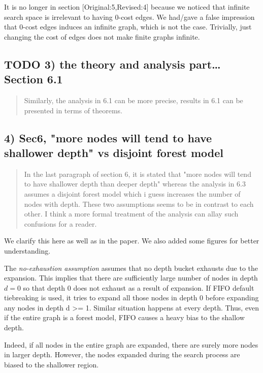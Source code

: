 \documentclass{article}
\begin{document}
It is no longer in section [Original:5,Revised:4] because we noticed that
infinite search space is irrelevant to having 0-cost edges.
We had/gave a false impression that 0-cost edges induces an infinite graph, which is not the case.
Trivially, just changing the cost of edges does not make finite graphs infinite.

\subsection{{\bfseries\sffamily TODO} 3) the theory and analysis part\ldots{} Section 6.1}
\label{sec:orgheadline17}

\begin{quote}
Similarly, the analysis in 6.1 can be more
precise, results in 6.1 can be presented in terms of theorems.
\end{quote}

\subsection{4) Sec6, "more nodes will tend to have shallower depth" vs disjoint forest model}
\label{sec:orgheadline18}

\begin{quote}
 In the last paragraph of section 6, it is stated that "more nodes
will tend to have shallower depth than deeper depth" whereas the
analysis in 6.3 assumes a disjoint forest model which i guess
increases the number of nodes with depth. These two assumptions seems
to be in contrast to each other. I think a more formal treatment of
the analysis can allay such confusions for a reader.
\end{quote}

We clarify this here as well as in the paper.
We also added some figures for better understanding.

The \emph{no-exhaustion assumption} assumes that no depth bucket exhausts due to the expansion.
This implies that there are sufficiently large number of nodes in depth \(d=0\) so that
 depth 0 does not exhaust as a result of expansion.
If FIFO default tiebreaking is used,
it tries to expand all those nodes in depth 0 before expanding any nodes in depth d >= 1.
Similar situation happens at every depth.
Thus, even if the entire graph is a forest model, FIFO causes a heavy bias to the shallow depth.

Indeed, if all nodes in the entire graph are expanded, there are surely more nodes in larger depth.
However, the nodes expanded during the search process are biased to the shallower region.
\end{document}
